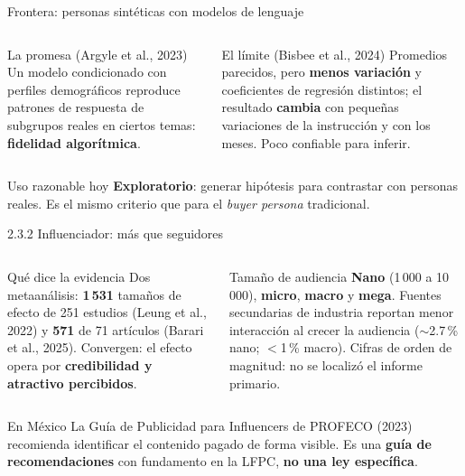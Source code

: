 \documentclass[aspectratio=169,xcolor=dvipsnames]{beamer}
\begin{document}
\begin{frame}{Frontera: personas sintéticas con modelos de lenguaje}
\begin{columns}[T]
  \begin{block}{La promesa (Argyle et al., 2023)}
    \small Un modelo condicionado con perfiles demográficos reproduce patrones de respuesta de subgrupos reales en ciertos temas: \textbf{fidelidad algorítmica}.
  \end{block}
  \begin{alertblock}{El límite (Bisbee et al., 2024)}
    \small Promedios parecidos, pero \textbf{menos variación} y coeficientes de regresión distintos; el resultado \textbf{cambia} con pequeñas variaciones de la instrucción y con los meses. Poco confiable para inferir.
  \end{alertblock}
\end{columns}
\vspace{6pt}
\begin{exampleblock}{Uso razonable hoy}
  \small \textbf{Exploratorio}: generar hipótesis para contrastar con personas reales. Es el mismo criterio que para el \textit{buyer persona} tradicional.
\end{exampleblock}
\end{frame}

\begin{frame}{2.3.2 Influenciador: más que seguidores}
\begin{columns}[T]
  \begin{block}{Qué dice la evidencia}
    \small Dos metaanálisis: \textbf{1\,531} tamaños de efecto de 251 estudios (Leung et al., 2022) y \textbf{571} de 71 artículos (Barari et al., 2025). Convergen: el efecto opera por \textbf{credibilidad y atractivo percibidos}.
  \end{block}
  \begin{exampleblock}{Tamaño de audiencia}
    \scriptsize \textbf{Nano} (1\,000 a 10\,000), \textbf{micro}, \textbf{macro} y \textbf{mega}. Fuentes secundarias de industria reportan menor interacción al crecer la audiencia (${\sim}$2.7\,\% nano; $<$1\,\% macro). Cifras de orden de magnitud: no se localizó el informe primario.
  \end{exampleblock}
\end{columns}
\vspace{4pt}
\begin{alertblock}{En México}
  \small La Guía de Publicidad para Influencers de PROFECO (2023) recomienda identificar el contenido pagado de forma visible. Es una \textbf{guía de recomendaciones} con fundamento en la LFPC, \textbf{no una ley específica}.
\end{alertblock}
\end{frame}
\end{document}
